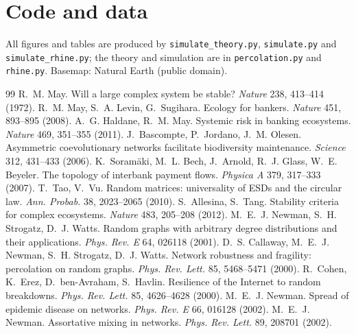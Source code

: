 \documentclass[11pt,a4paper]{article}
\theoremstyle{definition}
\theoremstyle{remark}
\begin{document}
\section*{Code and data}
All figures and tables are produced by \texttt{simulate\_theory.py}, \texttt{simulate.py} and \texttt{simulate\_rhine.py}; the theory and simulation are in \texttt{percolation.py} and \texttt{rhine.py}. Basemap: Natural Earth (public domain).

\begin{thebibliography}{99}
 R.~M. May. Will a large complex system be stable? \textit{Nature} 238, 413--414 (1972).
 R.~M. May, S.~A. Levin, G.~Sugihara. Ecology for bankers. \textit{Nature} 451, 893--895 (2008).
 A.~G. Haldane, R.~M. May. Systemic risk in banking ecosystems. \textit{Nature} 469, 351--355 (2011).
 J.~Bascompte, P.~Jordano, J.~M. Olesen. Asymmetric coevolutionary networks facilitate biodiversity maintenance. \textit{Science} 312, 431--433 (2006).
 K.~Soram\"aki, M.~L. Bech, J.~Arnold, R.~J. Glass, W.~E. Beyeler. The topology of interbank payment flows. \textit{Physica A} 379, 317--333 (2007).
 T.~Tao, V.~Vu. Random matrices: universality of ESDs and the circular law. \textit{Ann. Probab.} 38, 2023--2065 (2010).
 S.~Allesina, S.~Tang. Stability criteria for complex ecosystems. \textit{Nature} 483, 205--208 (2012).
 M.~E.~J. Newman, S.~H. Strogatz, D.~J. Watts. Random graphs with arbitrary degree distributions and their applications. \textit{Phys. Rev. E} 64, 026118 (2001).
 D.~S. Callaway, M.~E.~J. Newman, S.~H. Strogatz, D.~J. Watts. Network robustness and fragility: percolation on random graphs. \textit{Phys. Rev. Lett.} 85, 5468--5471 (2000).
 R.~Cohen, K.~Erez, D.~ben-Avraham, S.~Havlin. Resilience of the Internet to random breakdowns. \textit{Phys. Rev. Lett.} 85, 4626--4628 (2000).
 M.~E.~J. Newman. Spread of epidemic disease on networks. \textit{Phys. Rev. E} 66, 016128 (2002).
 M.~E.~J. Newman. Assortative mixing in networks. \textit{Phys. Rev. Lett.} 89, 208701 (2002).

\end{thebibliography}
\end{document}

